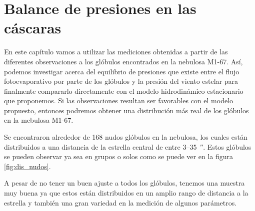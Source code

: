 \documentclass{book}
\begin{document}
\chapter{Balance de presiones en las cáscaras}

En este capítulo vamos a utilizar las mediciones obtenidas a partir de las diferentes observaciones a los glóbulos encontrados en la nebulosa M1-67. Así, podemos investigar acerca del equilibrio de presiones que existe entre el flujo fotoevaporativo por parte de los glóbulos y la presión del viento estelar para finalmente compararlo directamente con el modelo hidrodinámico estacionario que proponemos. Si las observaciones resultan ser favorables con el modelo propuesto, entonces podremos obtener una distribución más real de los glóbulos en la mebulosa M1-67.

Se encontraron alrededor de 168 nudos glóbulos en la nebulosa, los cuales están distribuidos a una distancia de la estrella central de entre 3--\SI{35}{\arcsecond}.  Estos glóbulos se pueden observar ya sea en grupos o solos como se puede ver en la figura \ref{fig:dis_nudos}. 

A pesar de no tener un buen ajuste a todos los glóbulos, tenemos una muestra muy buena ya que estos están distribuidos en un amplio rango de distancia a la estrella y también una gran variedad en la medición de algunos parámetros. 


\end{document}
